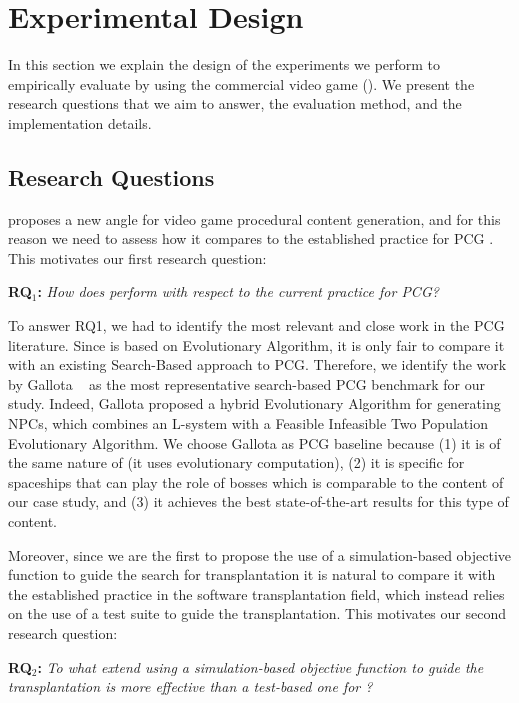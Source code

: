 \section{Experimental Design} 
\label{sec:Evaluation}
In this section we explain the design of the experiments we perform to empirically evaluate \ApproachName{} by using the commercial video game \CaseStudy(). We present the research questions that we aim to answer, the evaluation method, and the implementation details.

\subsection{Research Questions}
\ApproachName{} proposes a new angle for video game procedural content generation, and for this reason we need to assess how it compares to the established practice for PCG . This motivates our first research question:

\textbf{RQ$_1$: }\textit{How does \simhotep{} perform with respect to the current practice for PCG?}

To answer RQ1, we had to identify the most relevant and close work in the PCG literature. Since \ApproachName is based on Evolutionary Algorithm, it is only fair to compare it with an existing Search-Based approach to PCG. Therefore, we identify the work by Gallota \etal~\cite{gallotta2022evolving} as the most representative search-based  PCG benchmark for our study. Indeed, Gallota \etal proposed a hybrid Evolutionary Algorithm for generating NPCs, which combines an L-system with a Feasible Infeasible Two Population Evolutionary Algorithm. We choose Gallota \etal as PCG baseline because (1) it is of the same nature of \ApproachName (\ie it uses evolutionary computation), (2) it is specific for spaceships that can play the role of bosses which is comparable to the content of our \CaseStudy case study, and (3) it achieves the best state-of-the-art results for this type of content. 

Moreover,  since we are the first to propose the use of a simulation-based objective function to guide the search for transplantation it is natural to compare it with the established practice in the software transplantation field, which instead relies on the use of a test suite to guide the transplantation. This motivates our second research question:

\textbf{RQ$_2$: }\textit{To what extend using a simulation-based objective function to guide the transplantation is more effective than a test-based one for \ApproachName?}

